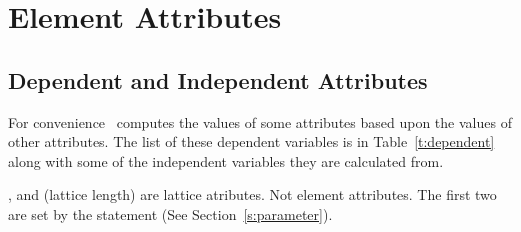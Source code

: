 \chapter {Element Attributes}

\section{Dependent and Independent Attributes} 
\label{s:dependent} 

For convenience \bmad\ computes the values of some attributes based
upon the values of other attributes. The list of these dependent
variables is in Table~\ref{t:dependent} along with some of the independent
variables they are calculated from.
\begin{table}[h]
\caption {Table of dependent variables and the independent variables 
they are calculated from.}
\label{t:dependent}
\end{table}
,  and  (lattice length) are
lattice atributes. Not element attributes. The first two are set by
the  statement (See Section~\ref{s:parameter}).

